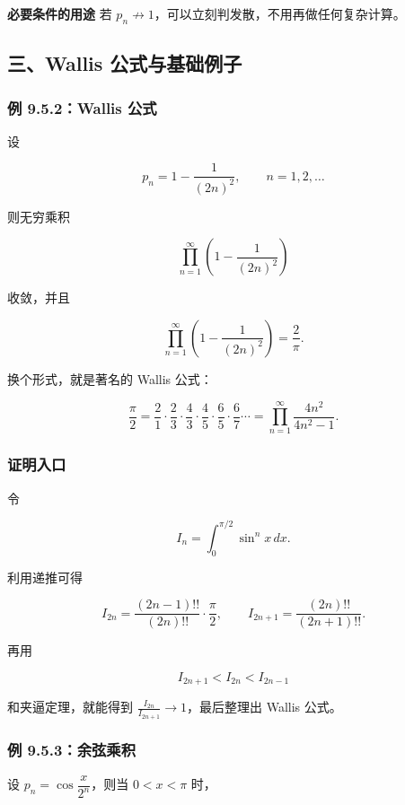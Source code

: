 \begin{conceptbox}
\textbf{必要条件的用途}
若 \(p_n\not\to1\)，可以立刻判发散，不用再做任何复杂计算。
\end{conceptbox}

\subsection*{三、Wallis 公式与基础例子}

\subsubsection*{例 9.5.2：Wallis 公式}

设

\[
      p_n=1-\frac{1}{(2n)^2},\qquad n=1,2,\ldots
    \]

则无穷乘积

\[
      \prod_{n=1}^{\infty}\left(1-\frac{1}{(2n)^2}\right)
    \]

收敛，并且

\[
      \prod_{n=1}^{\infty}\left(1-\frac{1}{(2n)^2}\right)=\frac{2}{\pi}.
    \]

换个形式，就是著名的 Wallis 公式：

\[
      \frac{\pi}{2}
      =
      \frac21\cdot\frac23\cdot\frac43\cdot\frac45\cdot\frac65\cdot\frac67\cdots
      =
      \prod_{n=1}^{\infty}\frac{4n^2}{4n^2-1}.
    \]

\subsubsection*{证明入口}

令

\[
      I_n=\int_0^{\pi/2}\sin^n x\,dx.
    \]

利用递推可得

\[
      I_{2n}=\frac{(2n-1)!!}{(2n)!!}\cdot\frac{\pi}{2},
      \qquad
      I_{2n+1}=\frac{(2n)!!}{(2n+1)!!}.
    \]

再用

\[
      I_{2n+1}<I_{2n}<I_{2n-1}
    \]

和夹逼定理，就能得到 \(\frac{I_{2n}}{I_{2n+1}}\to1\)，最后整理出 Wallis 公式。

\subsubsection*{例 9.5.3：余弦乘积}

设 \(p_n=\cos \dfrac{x}{2^n}\)，则当 \(0<x<\pi\) 时，

